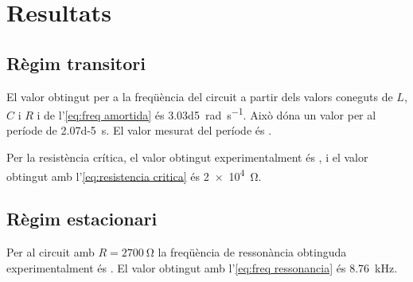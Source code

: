 \section{Resultats}
\subsection{Règim transitori}
El valor obtingut per a la freqüència del circuit a partir dels valors coneguts de \( L \), \( C \) i \( R \) i de l'\cref{eq:freq amortida} és \SI{3.03d5}{rad.s^{-1}}. Això dóna un valor per al període de \SI{2.07d-5}{s}. El valor mesurat del període és .   

Per la resistència crítica, el valor obtingut experimentalment és , i el valor obtingut amb l'\cref{eq:resistencia critica} és \SI{2e4}{\ohm}. 

\subsection{Règim estacionari}
Per al circuit amb \( R = \SI{2700}{\ohm} \) la freqüència de ressonància obtinguda experimentalment és . El valor obtingut amb l'\cref{eq:freq ressonancia} és \SI{8.76}{kHz}. 
